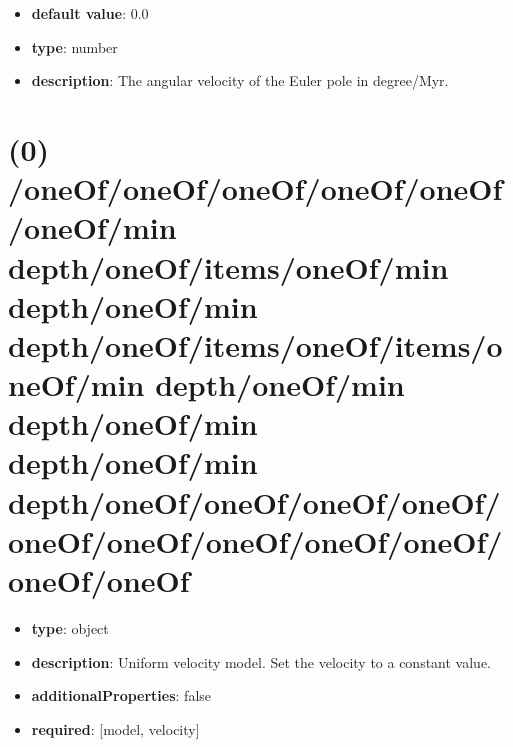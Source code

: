 \begin{itemize}[leftmargin=1em]\item {\bf default value}: 0.0
\item {\bf type}: number
\item {\bf description}: The angular velocity of the Euler pole in degree/Myr.
\end{itemize}\section{(0) /oneOf/oneOf/oneOf/oneOf/oneOf/oneOf/min depth/oneOf/items/oneOf/min depth/oneOf/min depth/oneOf/items/oneOf/items/oneOf/min depth/oneOf/min depth/oneOf/min depth/oneOf/min depth/oneOf/oneOf/oneOf/oneOf/oneOf/oneOf/oneOf/oneOf/oneOf/oneOf/oneOf}
\begin{itemize}[leftmargin=0em]\item {\bf type}: object
\item {\bf description}: Uniform velocity model. Set the velocity to a constant value.
\item {\bf additionalProperties}: false
\item {\bf required}: [model, velocity]\end{itemize}
